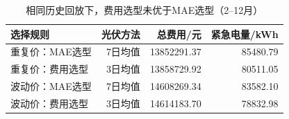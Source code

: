 \begin{table}[H]\centering\small
\caption{相同历史回放下，费用选型未优于MAE选型（2--12月）}\label{tab:economic_results}
\begin{tabular}{lrrr}\toprule
选择规则 & 光伏方法 & 总费用/元 & 紧急电量/kWh \\\midrule
重复价：MAE选型 & 7日均值 & 13852291.37 & 85480.79 \\
重复价：费用选型 & 3日均值 & 13858729.92 & 80511.05 \\
波动价：MAE选型 & 7日均值 & 14608269.34 & 83582.10 \\
波动价：费用选型 & 3日均值 & 14614183.70 & 78832.98 \\
\bottomrule\end{tabular}\end{table}
